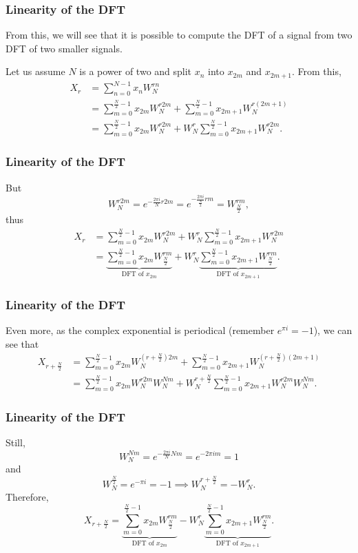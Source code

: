 \documentclass{beamer}
\begin{document}
\begin{frame}
    \frametitle{Linearity of the DFT}
    From this, we will see that it is possible to compute the DFT of a signal from two DFT of two smaller signals.

    Let us assume $N$ is a power of two and split $x_{n}$ into $x_{2m}$ and $x_{2m+1}$. From this,
    \begin{align*}
        X_r &= \sum_{n=0}^{N-1} x_{n} W_N^{r n} \\
	&= \sum_{m=0}^{\frac{N}{2}-1} x_{2m} W_N^{r 2m} + \sum_{m=0}^{\frac{N}{2}-1} x_{2m+1}W_N^{r\left( 2m+1 \right) } \\
	&= \sum_{m=0}^{\frac{N}{2}-1} x_{2m} W_N^{r 2m} + W_N^{r}			\sum_{m=0}^{\frac{N}{2}-1} x_{2m+1}W_N^{r2m}
    .\end{align*}
\end{frame}

\begin{frame}
    \frametitle{Linearity of the DFT}
    But \[
    W_N^{r 2m} = e^{-\frac{2\pi i}{N} r 2m} = e^{-\frac{2\pi i}{\frac{N}{2}} r m} = W_{\frac{N}{2}}^{rm}
    ,\] thus
    \begin{align*}
	X_r &= \sum_{m=0}^{\frac{N}{2}-1} x_{2m} W_N^{r 2m} + W_N^{r}			\sum_{m=0}^{\frac{N}{2}-1} x_{2m+1}W_N^{r2m} \\
	    &= \underbrace{\sum_{m=0}^{\frac{N}{2}-1} x_{2m} W_{\frac{N}{2}}^{r m}}_{\text{DFT of }x_{2m}} + W_N^{r}\underbrace{\sum_{m=0}^{\frac{N}{2}-1} x_{2m+1}W_{\frac{N}{2}}^{rm}}_{\text{DFT of }x_{2m+1}}
    .\end{align*}
\end{frame}

\begin{frame}
    \frametitle{Linearity of the DFT}
    Even more, as the complex exponential is periodical (remember $e^{\pi i} = -1$), we can see that
    \begin{align*}
        X_{r+\frac{N}{2}} &= \sum_{m=0}^{\frac{N}{2}-1} x_{2m} W_N^{\left( r + \frac{N}{2} \right)  2m} + \sum_{m=0}^{\frac{N}{2}-1} x_{2m+1}W_N^{\left( r + \frac{N}{2} \right)\left( 2m+1 \right) } \\
	&= \sum_{m=0}^{\frac{N}{2}-1} x_{2m} W_N^{r 2m} W_N^{N m} + W_N^{r+\frac{N}{2}}\sum_{m=0}^{\frac{N}{2}-1} x_{2m+1}W_N^{r2m}W_N^{N m}
    .\end{align*}
\end{frame}

\begin{frame}
    \frametitle{Linearity of the DFT}
    Still, \[
	W_N^{N m} = e^{-\frac{2\pi i}{N} N m} = e^{-2 \pi i m} = 1
    \] and \[
	W_N^{\frac{N}{2}} = e^{-\pi i} = -1 \implies W_N^{r + \frac{N}{2}} = -W_N^{r}
    .\] Therefore, \[
	X_{r+\frac{N}{2}}= \underbrace{\sum_{m=0}^{\frac{N}{2}-1} x_{2m} W_{\frac{N}{2}}^{r m}}_{\text{DFT of }x_{2m}} - W_N^{r}\underbrace{\sum_{m=0}^{\frac{N}{2}-1} x_{2m+1}W_{\frac{N}{2}}^{rm}}_{\text{DFT of }x_{2m+1}}
    .\] 
\end{frame}
\end{document}
